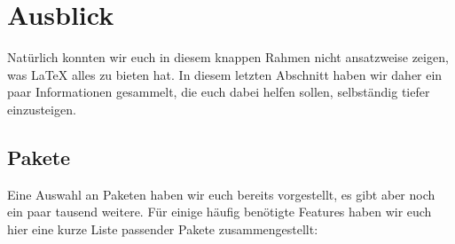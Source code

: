 \section{Ausblick}

Natürlich konnten wir euch in diesem knappen Rahmen nicht ansatzweise zeigen, was \LaTeX{} alles zu bieten hat.
In diesem letzten Abschnitt haben wir daher ein paar Informationen gesammelt, die euch dabei helfen sollen, selbständig tiefer einzusteigen.

\subsection{Pakete}

Eine Auswahl an Paketen haben wir euch bereits vorgestellt, es gibt aber noch ein paar tausend weitere.
Für einige häufig benötigte Features haben wir euch hier eine kurze Liste passender Pakete zusammengestellt:


